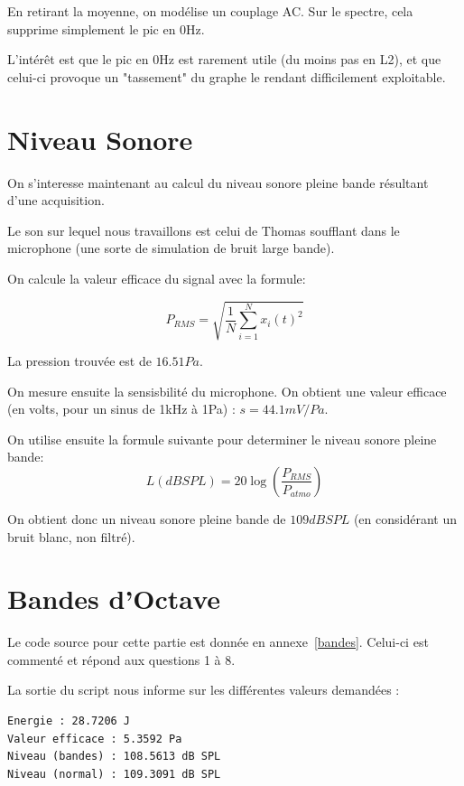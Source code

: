 \documentclass[11pt,a4paper]{article}
\begin{document}
En retirant la moyenne, on modélise un couplage AC. Sur le spectre, cela supprime simplement le pic en 0Hz.

L'intérêt est que le pic en 0Hz est rarement utile (du moins pas en L2), et que celui-ci provoque un "tassement" du
graphe le rendant difficilement exploitable.

\section{Niveau Sonore}

On s'interesse maintenant au calcul du niveau sonore pleine bande résultant d'une acquisition.

Le son sur lequel nous travaillons est celui de Thomas soufflant dans le microphone (une sorte de simulation de bruit
large bande).

On calcule la valeur efficace du signal avec la formule:

\begin{equation}
P_{RMS} = \sqrt{ \frac {1}{N} \sum_{i=1}^N x_i(t)^2} 
\end{equation}
    
La pression trouvée est de $16.51Pa$.

On mesure ensuite la sensisbilité du microphone. On obtient une valeur efficace (en volts, pour un sinus de 1kHz à 1Pa) : $s = 44.1mV/Pa$.

On utilise ensuite la formule suivante pour determiner le niveau sonore pleine bande:
	\begin{equation}
    L(dB SPL) = 20 \log\left(\frac{P_{RMS}}{P_{atmo}}\right)
    \end{equation}

On obtient donc un niveau sonore pleine bande de $109dB SPL$ (en considérant un bruit blanc, non filtré).

\section{Bandes d'Octave}

Le code source pour cette partie est donnée en annexe~\ref{bandes}.
Celui-ci est commenté et répond aux questions 1 à 8.

La sortie du script nous informe sur les différentes valeurs demandées :

\begin{verbatim}
Energie : 28.7206 J
Valeur efficace : 5.3592 Pa
Niveau (bandes) : 108.5613 dB SPL
Niveau (normal) : 109.3091 dB SPL
\end{verbatim}
\end{document}
